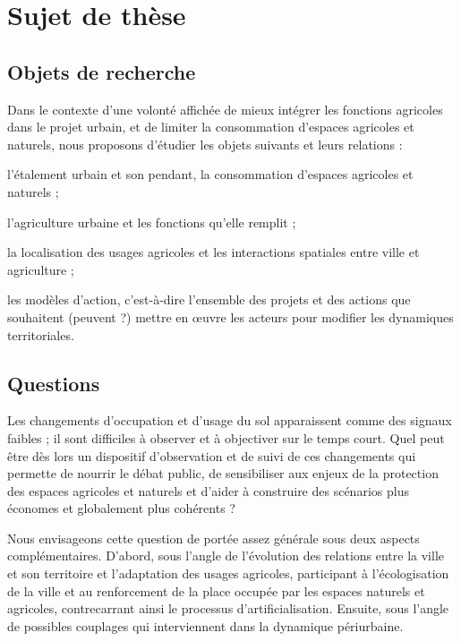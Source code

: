 \section[sujet]{Sujet de thèse}

\subsection{Objets de recherche}

Dans le contexte d'une volonté affichée de mieux intégrer les fonctions agricoles
dans le projet urbain,
et de limiter la consommation d'espaces agricoles et naturels,
nous proposons d'étudier les objets suivants et leurs relations :

\startitemize[packed]

\item l'étalement urbain et son pendant, la consommation d'espaces agricoles et naturels ;
\item l'agriculture urbaine et les fonctions qu'elle remplit ;
\item la localisation des usages agricoles
  et les interactions spatiales entre ville et agriculture ;
\item les modèles d'action, c'est-à-dire l'ensemble
  des projets et des actions que souhaitent (peuvent ?) mettre en œuvre
  les acteurs pour modifier les dynamiques territoriales.

\stopitemize

\subsection{Questions}

Les changements d'occupation et d'usage du sol apparaissent comme des signaux faibles ;
il sont difficiles à observer et à objectiver sur le temps court.
Quel peut être dès lors un dispositif d'observation et de suivi de ces changements
qui permette de nourrir le débat public, de sensibiliser aux enjeux de la protection
des espaces agricoles et naturels et d'aider à construire des scénarios
plus économes et globalement plus cohérents ?

Nous envisageons cette question de portée assez générale
sous deux aspects complémentaires. D'abord, sous l'angle de 
l'évolution des relations entre la ville et son territoire et l'adaptation
des usages agricoles, participant à l'écologisation de la ville et
au renforcement de la place occupée par les espaces naturels et agricoles,
contrecarrant ainsi le processus d'artificialisation.
Ensuite, sous l'angle de possibles couplages
qui interviennent dans la dynamique périurbaine.

